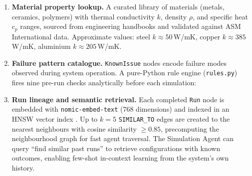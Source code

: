 \documentclass[twocolumn]{article}
\begin{document}
\begin{enumerate}
  \item \textbf{Material property lookup.}  A curated library of materials
        (metals, ceramics, polymers) with thermal conductivity $k$,
        density $\rho$, and specific heat $c_p$ ranges, sourced from
        engineering handbooks and validated against ASM International data.
        Approximate values: steel $k \approx 50$\,W/mK, copper
        $k \approx 385$\,W/mK, aluminium $k \approx 205$\,W/mK.

  \item \textbf{Failure pattern catalogue.}  \texttt{KnownIssue} nodes
        encode failure modes observed during system operation.
        A pure-Python rule engine (\texttt{rules.py}) fires nine
        pre-run checks analytically before each simulation:

        \smallskip\par

  \item \textbf{Run lineage and semantic retrieval.}  Each completed
        \texttt{Run} node is embedded with \texttt{nomic-embed-text}
        \citep{nussbaum2024nomic} (768 dimensions) and indexed in an
        HNSW vector index \citep{malkov2020hnsw}.  Up to
        $k{=}5$ \texttt{SIMILAR\_TO} edges are created to the nearest
        neighbours with cosine similarity $\ge 0.85$, precomputing the
        neighbourhood graph for fast agent traversal.  The Simulation
        Agent can query ``find similar past runs'' to retrieve configurations
        with known outcomes, enabling few-shot in-context learning from
        the system's own history.
\end{enumerate}
\end{document}
